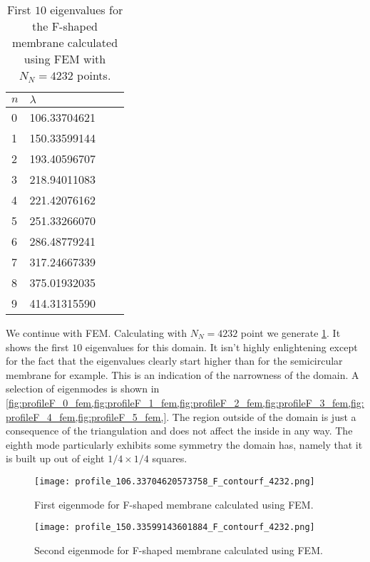 \documentclass[10pt,a4paper,twocolumn]{article}
\begin{document}
\begin{table}[!t]
    \centering
    \begin{tabular}{|l|l|l|l|}
    \hline
    $n$ & $\lambda$ \\ \hline \hline
    0 & 106.33704621\\ \hline
    1 & 150.33599144 \\ \hline
    2 & 193.40596707 \\ \hline
    3 & 218.94011083 \\ \hline
    4 & 221.42076162  \\ \hline
    5 & 251.33266070 \\ \hline
    6 & 286.48779241 \\ \hline
    7 & 317.24667339 \\ \hline
    8 & 375.01932035 \\ \hline
    9 & 414.31315590 \\ \hline
    \end{tabular}
    \caption{First $10$ eigenvalues for the F-shaped membrane calculated using FEM with $N_N=4232$ points.}
    \label{tab:FFEM}
\end{table}

We continue with FEM. Calculating with $N_N=4232$ point we generate \cref{tab:FFEM}. It shows the first $10$ eigenvalues for this domain. It isn't highly enlightening except for the fact that the eigenvalues clearly start higher than for the semicircular membrane for example. This is an indication of the narrowness of the domain. A selection of eigenmodes is shown in \cref{fig:profileF_0_fem,fig:profileF_1_fem,fig:profileF_2_fem,fig:profileF_3_fem,fig:profileF_4_fem,fig:profileF_5_fem,}. The region outside of the domain is just a consequence of the triangulation and does not affect the inside in any way. The eighth mode particularly exhibits some symmetry the domain has, namely that it is built up out of eight $1/4 \times 1/4$ squares.

\begin{figure}[!h]
    \centering
    \texttt{[image: profile\_106.33704620573758\_F\_contourf\_4232.png]}
    \caption{First eigenmode for F-shaped membrane calculated using FEM.}
    \label{fig:profileF_0_fem}
\end{figure}

\begin{figure}[!b]
    \centering
    \texttt{[image: profile\_150.33599143601884\_F\_contourf\_4232.png]}
    \caption{Second eigenmode for F-shaped membrane calculated using FEM.}
    \label{fig:profileF_1_fem}
\end{figure}
\end{document}
